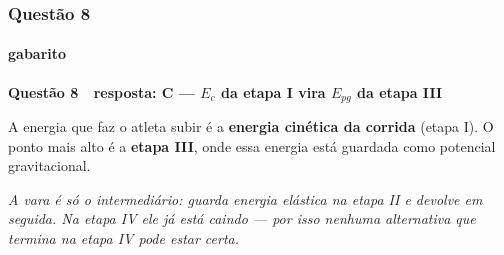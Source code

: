 \documentclass[aspectratio=169,12pt]{beamer}
\newcommand{\resposta}[2]{%
  \par\vspace{0.2em}
  {\Large\bfseries\color{vinho}Quest\~ao #1 \,\textemdash\, resposta: #2}
  \par\vspace{0.6em}}
\begin{document}
\begin{frame}
\frametitle{Quest\~ao 8}
\framesubtitle{gabarito}
\resposta{8}{C --- $E_c$ da etapa I vira $E_{pg}$ da etapa III}

A energia que faz o atleta subir \'e a \textbf{energia cin\'etica da
corrida} (etapa I). O ponto mais alto \'e a \textbf{etapa III}, onde
essa energia est\'a guardada como potencial gravitacional.

\vspace{0.4em}
\begin{center}
\end{center}

\vspace{0.3em}
{\color{grafite}\itshape A vara \'e s\'o o intermedi\'ario: guarda
energia el\'astica na etapa II e devolve em seguida. Na etapa IV ele
j\'a est\'a caindo --- por isso nenhuma alternativa que termina na
etapa IV pode estar certa.}
\end{frame}
\end{document}
